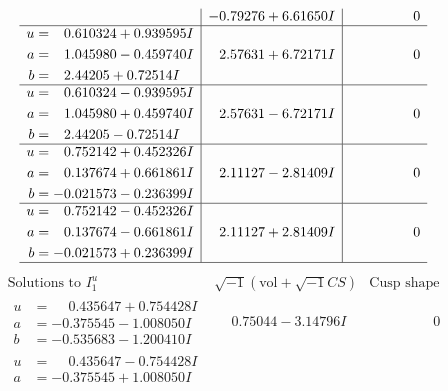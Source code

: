 \documentclass[1p]{elsarticle_modified}
\theoremstyle{definition}
\newcommand{\I}{\sqrt{-1}}
\begin{document}
$$\begin{array}{c|c|c}
 & -0.79276 + 6.61650 I & \phantom{-0.000000 } 0 \\ \hline\begin{aligned}
u &= \phantom{-}0.610324 + 0.939595 I \\
a &= \phantom{-}1.045980 - 0.459740 I \\
b &= \phantom{-}2.44205 + 0.72514 I\end{aligned}
 & \phantom{-}2.57631 + 6.72171 I & \phantom{-0.000000 } 0 \\ \hline\begin{aligned}
u &= \phantom{-}0.610324 - 0.939595 I \\
a &= \phantom{-}1.045980 + 0.459740 I \\
b &= \phantom{-}2.44205 - 0.72514 I\end{aligned}
 & \phantom{-}2.57631 - 6.72171 I & \phantom{-0.000000 } 0 \\ \hline\begin{aligned}
u &= \phantom{-}0.752142 + 0.452326 I \\
a &= \phantom{-}0.137674 + 0.661861 I \\
b &= -0.021573 - 0.236399 I\end{aligned}
 & \phantom{-}2.11127 - 2.81409 I & \phantom{-0.000000 } 0 \\ \hline\begin{aligned}
u &= \phantom{-}0.752142 - 0.452326 I \\
a &= \phantom{-}0.137674 - 0.661861 I \\
b &= -0.021573 + 0.236399 I\end{aligned}
 & \phantom{-}2.11127 + 2.81409 I & \phantom{-0.000000 } 0\\
 \hline 
 \end{array}$$\newpage$$\begin{array}{c|c|c}  
\text{Solutions to }I^u_{1}& \I (\text{vol} + \sqrt{-1}CS) & \text{Cusp shape}\\
 \hline 
\begin{aligned}
u &= \phantom{-}0.435647 + 0.754428 I \\
a &= -0.375545 - 1.008050 I \\
b &= -0.535683 - 1.200410 I\end{aligned}
 & \phantom{-}0.75044 - 3.14796 I & \phantom{-0.000000 } 0 \\ \hline\begin{aligned}
u &= \phantom{-}0.435647 - 0.754428 I \\
a &= -0.375545 + 1.008050 I \\

\end{aligned}
\end{array}$$
\end{document}

